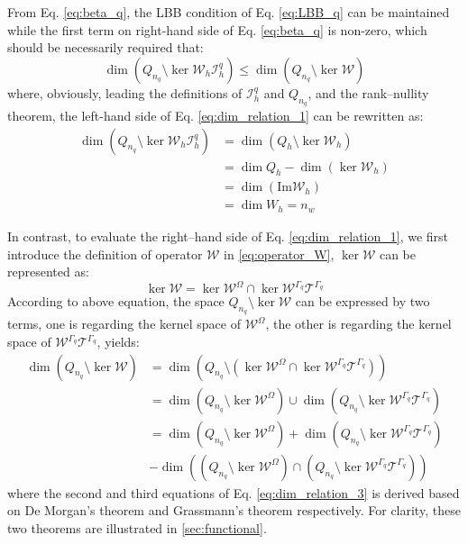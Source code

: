 From Eq. \eqref{eq:beta_q}, the LBB condition of Eq. \eqref{eq:LBB_q} can be maintained while the first term on right-hand side of Eq. \eqref{eq:beta_q} is non-zero, which should be necessarily required that:
\begin{equation}\label{eq:dim_relation_1}
    \dim \left(Q_{n_q} \setminus \ker \mathcal W_h \mathcal I_h^q\right) \le \dim \left(Q_{n_q} \setminus \ker \mathcal W\right)
\end{equation}
where, obviously, leading the definitions of $\mathcal I_h^q$ and $Q_{n_q}$, and the rank--nullity theorem, the left-hand side of Eq. \eqref{eq:dim_relation_1} can be rewritten as:
\begin{equation}\label{eq:dim_relation_2}
    \begin{split}
        \dim \left(Q_{n_q} \setminus \ker \mathcal W_h \mathcal I_h^q\right) &= \dim \left(Q_h\setminus \ker \mathcal W_h\right) \\
        &= \dim Q_h - \dim \left(\ker \mathcal W_h\right) \\
        &= \dim(\mathrm{Im} \mathcal W_h) \\
        &= \dim W_h = n_w
    \end{split}
\end{equation}

In contrast, to evaluate the right--hand side of Eq. \eqref{eq:dim_relation_1}, we first introduce the definition of operator $\mathcal W$ in \eqref{eq:operator_W}, $\ker \mathcal W$ can be represented as:
\begin{equation}\label{eq:space_W}
    \ker \mathcal W = \ker \mathcal W^\Omega \cap \ker \mathcal W^{\Gamma_q} \mathcal T^{\Gamma_q}
\end{equation}
According to above equation, the space $Q_{n_q}\setminus \ker \mathcal W$ can be expressed by two terms,
one is regarding the kernel space of $\mathcal W^\Omega$, the other is regarding the kernel space of $\mathcal W^{\Gamma_q}\mathcal T^{\Gamma_q}$, yields:
\begin{equation}\label{eq:dim_relation_3}
    \begin{split}
        \dim(Q_{n_q}\setminus\ker\mathcal W)
        &=\dim \left(Q_{n_q}\setminus (\ker\mathcal W^\Omega\cap\ker\mathcal W^{\Gamma_q}\mathcal T^{\Gamma_q})\right) \\
        &=\dim\left(Q_{n_q} \setminus \ker \mathcal W^\Omega\right)
        \cup 
        \dim\left(Q_{n_q}\setminus \ker \mathcal W^{\Gamma_q}\mathcal T^{\Gamma_q}\right) \\
        &= \dim\left(Q_{n_q}\setminus\ker \mathcal W^\Omega\right)
        +\dim\left(Q_{n_q}\setminus \ker \mathcal W^{\Gamma_q}\mathcal T^{\Gamma_q}\right) \\
        &-\dim\left((Q_{n_q}\setminus\ker \mathcal W^\Omega)\cap (Q_{n_q}\setminus \ker \mathcal W^{\Gamma_q}\mathcal T^{\Gamma_q})\right)
    \end{split}
\end{equation}
where the second and third equations of Eq. \eqref{eq:dim_relation_3} is derived based on De Morgan's theorem\cite{} and Grassmann's theorem\cite{} respectively.
For clarity, these two theorems are illustrated in \ref{sec:functional}.

